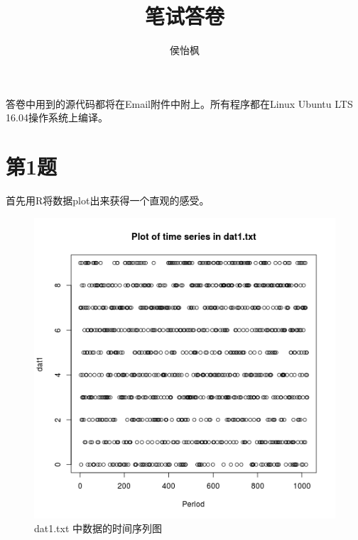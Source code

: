 \documentclass[11pt]{article}
\title{笔试答卷}
\author{侯怡枫}
\begin{document}
\maketitle

答卷中用到的源代码都将在Email附件中附上。所有程序都在Linux Ubuntu LTS 16.04操作系统上编译。

\section*{第1题}

首先用R将数据plot出来获得一个直观的感受。
\begin{figure}[h]
	\centering
	\includegraphics[scale=0.4]{dat1_plot.png}
	\caption{dat1.txt 中数据的时间序列图}
\label{dat1_plot}
\end{figure}
\end{document}
